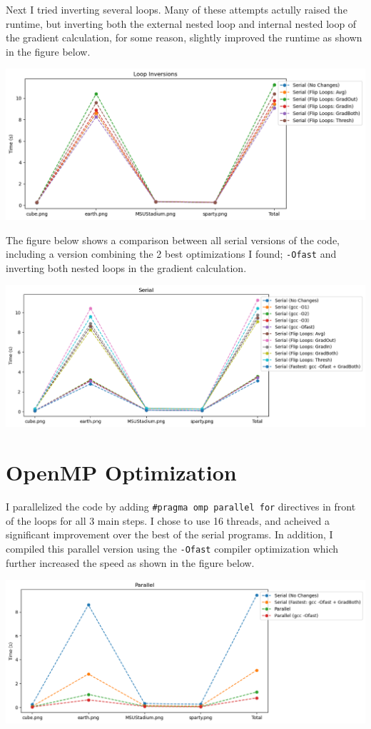 \documentclass[9pt, technote, onecolumn]{IEEEtran}
\begin{document}
Next I tried inverting several loops. Many of these attempts actully raised the runtime, but inverting both the external nested loop and internal nested loop of the gradient calculation, for some reason, slightly improved the runtime as shown in the figure below.

\includegraphics[width=6in]{LoopInversions.png}

The figure below shows a comparison between all serial versions of the code, including a version combining the 2 best optimizations I found; \texttt{-Ofast} and inverting both nested loops in the gradient calculation.

\includegraphics[width=6in]{Serial.png}

\section{OpenMP Optimization}

I parallelized the code by adding \texttt{\#pragma omp parallel for} directives in front of the loops for all 3 main steps. I chose to use 16 threads, and acheived a significant improvement over the best of the serial programs. In addition, I compiled this parallel version using the \texttt{-Ofast} compiler optimization which further increased the speed as shown in the figure below.

\includegraphics[width=6in]{Parallel.png}
\end{document}
